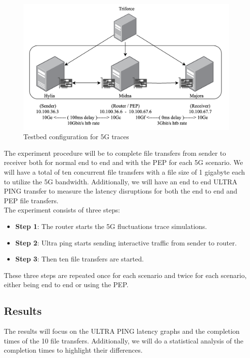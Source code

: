 \documentclass[a4paper,english, 11pt]{report}
\begin{document}
\begin{figure}[!h!] %
	\centering
	\includegraphics[scale=0.60]{../diagrams/drawio/testbed2.png}
  	\caption{Testbed configuration for 5G traces}
  	\label{fig:testbed2}
\end{figure}

The experiment procedure will be to complete file transfers from sender to receiver both for normal end to end and with the PEP for each 5G scenario. We will have a total of ten concurrent file transfers with a file size of 1 gigabyte each to utilize the 5G bandwidth. Additionally, we will have an end to end ULTRA PING transfer to measure the latency disruptions for both the end to end and PEP file transfers.\\

The experiment consists of three steps:
\begin{itemize}
  \item \textbf{Step 1}: The router starts the 5G fluctuations trace simulations.
  \item \textbf{Step 2}: Ultra ping starts sending interactive traffic from sender to router.
  \item \textbf{Step 3}: Then ten file transfers are started.
\end{itemize}
These three steps are repeated once for each scenario and twice for each scenario, either being end to end or using the PEP.

\subsection{Results}

The results will focus on the ULTRA PING latency graphs and the completion times of the 10 file transfers. Additionally, we will do a statistical analysis of the completion times to highlight their differences.
\end{document}

